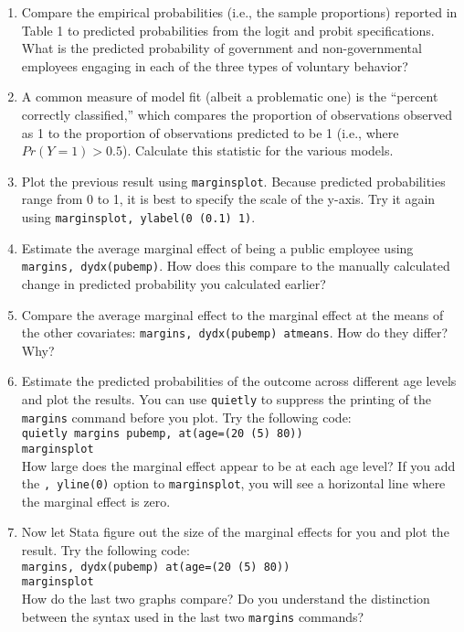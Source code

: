 \documentclass[a4paper,12pt]{article}
\begin{document}
\begin{enumerate}
\item Compare the empirical probabilities (i.e., the sample proportions) reported in Table 1 to predicted probabilities from the logit and probit specifications. What is the predicted probability of government and non-governmental employees engaging in each of the three types of voluntary behavior?

\item A common measure of model fit (albeit a problematic one) is the ``percent correctly classified,'' which compares the proportion of observations observed as 1 to the proportion of observations predicted to be 1 (i.e., where $Pr(Y=1) > 0.5$). Calculate this statistic for the various models.

\item Plot the previous result using \texttt{marginsplot}. Because predicted probabilities range from 0 to 1, it is best to specify the scale of the y-axis. Try it again using \texttt{marginsplot, ylabel(0 (0.1) 1)}.

\item Estimate the average marginal effect of being a public employee using \texttt{margins, dydx(pubemp)}. How does this compare to the manually calculated change in predicted probability you calculated earlier?

\item Compare the average marginal effect to the marginal effect at the means of the other covariates: \texttt{margins, dydx(pubemp) atmeans}. How do they differ? Why?

\item Estimate the predicted probabilities of the outcome across different age levels and plot the results. You can use \texttt{quietly} to suppress the printing of the \texttt{margins} command before you plot. Try the following code:\\
\texttt{quietly margins pubemp, at(age=(20 (5) 80))\\
marginsplot}\\
How large does the marginal effect appear to be at each age level? If you add the \texttt{, yline(0)} option to \texttt{marginsplot}, you will see a horizontal line where the marginal effect is zero.

\item Now let Stata figure out the size of the marginal effects for you and plot the result. Try the following code:\\
\texttt{margins, dydx(pubemp) at(age=(20 (5) 80))\\
marginsplot}\\
How do the last two graphs compare? Do you understand the distinction between the syntax used in the last two \texttt{margins} commands?


\end{enumerate}
\end{document}

